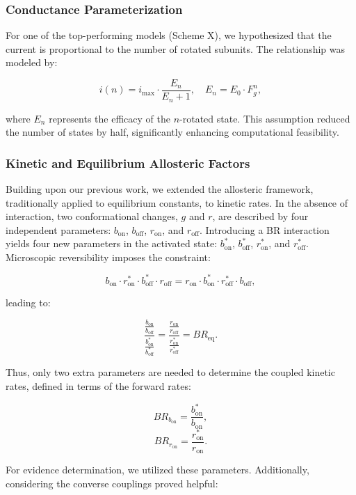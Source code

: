 \documentclass[pdflatex,sn-mathphys-num]{sn-jnl}%
\theoremstyle{thmstyleone}%
\theoremstyle{thmstyletwo}%
\theoremstyle{thmstylethree}%
\begin{document}
\subsubsection{Conductance Parameterization}

For one of the top-performing models (Scheme X), we hypothesized that the current is proportional to the number of rotated subunits. The relationship was modeled by:

\[
i(n) = i_{\text{max}} \cdot \frac{E_n}{E_n + 1}, \quad E_n = E_0 \cdot F_g^n,
\]

where \( E_n \) represents the efficacy of the \( n \)-rotated state. This assumption reduced the number of states by half, significantly enhancing computational feasibility.

\subsubsection{Kinetic and Equilibrium Allosteric Factors}

Building upon our previous work, we extended the allosteric framework, traditionally applied to equilibrium constants, to kinetic rates. In the absence of interaction, two conformational changes, \( g \) and \( r \), are described by four independent parameters: \( b_{\text{on}} \), \( b_{\text{off}} \), \( r_{\text{on}} \), and \( r_{\text{off}} \). Introducing a BR interaction yields four new parameters in the activated state: \( b^*_{\text{on}} \), \( b^*_{\text{off}} \), \( r^*_{\text{on}} \), and \( r^*_{\text{off}} \). Microscopic reversibility imposes the constraint:

\[
b_{\text{on}} \cdot r^*_{\text{on}} \cdot b^*_{\text{off}} \cdot r_{\text{off}} = r_{\text{on}} \cdot b^*_{\text{on}} \cdot r^*_{\text{off}} \cdot b_{\text{off}},
\]

leading to:

\[
\frac {\frac {b_{\text{on}}}{b_{\text{off}}}}{\frac {b^*_{\text{on}}} {b^*_{\text{off}}}} = \frac {\frac {r_{\text{on}}}{r_{\text{off}}}}{\frac {r^*_{\text{on}}} {r^*_{\text{off}}}} = BR_{\text{eq}}.
\]

Thus, only two extra parameters are needed to determine the coupled kinetic rates, defined in terms of the forward rates:

\[
BR_{b_{\text{on}}} = \frac{b^*_{\text{on}}}{b_{\text{on}}},
\]
\[
BR_{r_{\text{on}}} = \frac{r^*_{\text{on}}}{r_{\text{on}}}.
\]

For evidence determination, we utilized these parameters. Additionally, considering the converse couplings proved helpful:
\end{document}
